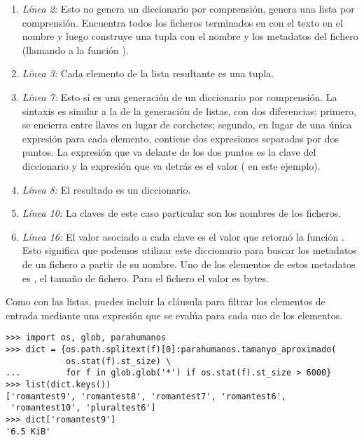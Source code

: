 \begin{enumerate}

\item \emph{Línea 2:} Esto no genera un diccionario por comprensión, genera una lista por comprensión. Encuentra todos los ficheros terminados en  con el texto  en el nombre y luego construye una tupla con el nombre y los metadatos del fichero (llamando a la función ).

\item \emph{Línea 3:} Cada elemento de la lista resultante es una tupla.

\item \emph{Línea 7:} Esto sí es una generación de un diccionario por comprensión. La sintaxis es similar a la de la generación de listas, con dos diferencias: primero, se encierra entre llaves en lugar de corchetes; segundo, en lugar de una única expresión para cada elemento, contiene dos expresiones separadas por dos puntos. La expresión que va delante de los dos puntos es la clave del diccionario y la expresión que va detrás es el valor ( en este ejemplo).

\item \emph{Línea 8:} El resultado es un diccionario.

\item \emph{Línea 10:} La claves de este caso particular son los nombres de los ficheros.

\item \emph{Línea 16:} El valor asociado a cada clave es el valor que retornó la función . Esto significa que podemos utilizar este diccionario para buscar los metadatos de un fichero a partir de su nombre. Uno de los elementos de estos metadatos es , el tamaño de fichero. Para el fichero  el valor es  bytes.

\end{enumerate}

Como con las listas, puedes incluir la cláusula  para filtrar los elementos de entrada mediante una expresión que se evalúa para cada uno de los elementos.

\noindent\begin{minipage}{\textwidth}
\begin{lstlisting}[mathescape=True]
>>> import os, glob, parahumanos
>>> dict = {os.path.splitext(f)[0]:parahumanos.tamanyo_aproximado(
            os.stat(f).st_size) \     
...         for f in glob.glob('*') if os.stat(f).st_size > 6000}
>>> list(dict.keys())
['romantest9', 'romantest8', 'romantest7', 'romantest6', 
 'romantest10', 'pluraltest6']
>>> dict['romantest9']
'6.5 KiB'
\end{lstlisting}
\end{minipage}


